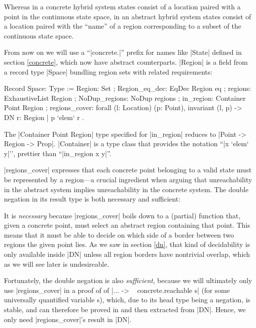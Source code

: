 \documentclass[runningheads]{llncs}
\begin{document}
Whereas in a concrete hybrid system states consist of a location
paired with a point in the continuous state space, in an abstract
hybrid system states consist of a location paired with the ``name'' of
a region corresponding to a subset of the continuous state space.

From now on we will use a ``|concrete.|'' prefix for names like
|State| defined in section \ref{concrete}, which now have abstract
counterparts. |Region| is a field from a record type |Space| bundling
region sets with related requirements:

\begin{code}
  Record Space: Type :=
    { Region: Set
    ; Region_eq_dec: EqDec Region eq
    ; regions: ExhaustiveList Region
    ; NoDup_regions: NoDup regions
    ; in_region: Container Point Region
    ; regions_cover: forall (l: Location) (p: Point),
        invariant (l, p) -> DN { r: Region | p `elem` r }
    }.
\end{code}

The |Container Point Region| type specified for |in_region| reduces to
|Point -> Region -> Prop|. |Container| is a type class that provides
the notation ``|x `elem` y|'', prettier than ``|in_region x
y|''. 

|regions_cover| expresses that each concrete point belonging to a
valid state must be represented by a region---a crucial ingredient
when arguing that unreachability in the abstract system implies
unreachability in the concrete system. The double negation in its
result type is both necessary and sufficient:

It is \emph{necessary} because |regions_cover| boils down to a
(partial) function that, given a concrete point, must select an
abstract region containing that point. This means that it must be able
to decide on which side of a border between two regions the given
point lies. As we saw in section \ref{dn}, that kind of decidability
is only available inside |DN| unless all region borders have
nontrivial overlap, which as we will see later is undesireable.

Fortunately, the double negation is also \emph{sufficient}, because we
will ultimately only use |regions_cover| in a proof of of |... -> ~
concrete.reachable s| (for some universally quantified variable s),
which, due to its head type being a negation, is stable, and can
therefore be proved in and then extracted from |DN|. Hence, we only
need |regions_cover|'s result in |DN|.
\end{document}

